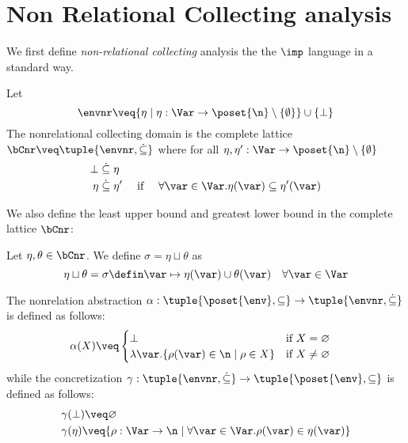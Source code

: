 \section{Non Relational Collecting analysis}
\label{sec:nonrel}

We first define \emph{non-relational collecting} analysis the the
\(\imp\) language in a standard way.

\begin{definition}
  Let
  \begin{equation*}
    \envnr \veq \{\eta \mid \eta: \Var \to \poset{\n}\setminus
    \{\emptyset\}\} \cup \{\bot\}
  \end{equation*}
  The nonrelational collecting domain is the complete lattice
  \(\bCnr \veq \tuple{\envnr,\dot{\subseteq}}\) where for all
  \(\eta,\eta':\Var \to \poset{\n} \setminus \{\emptyset\}\)
  \begin{align*}
    \bot & \mathrel{\dot{\subseteq}} \eta\\
    \eta & \mathrel{\dot{\subseteq}} \eta' & \text{ if }\quad \forall
      \var\in \Var. \eta(\var)\subseteq \eta'(\var)
  \end{align*}
\end{definition}

We also define the least upper bound and greatest lower bound in the
complete lattice \(\bCnr\):

\begin{definition}
  Let \(\eta, \theta \in \bCnr\). We define
  \(\sigma = \eta \sqcup \theta\) as
  \begin{equation*}
    \eta \sqcup \theta = \sigma \defin \var \mapsto \eta(\var) \cup \theta(\var) \quad \forall \var \in \Var
  \end{equation*}
\end{definition}

The nonrelation abstraction \(\alpha: \tuple{\poset{\env},\subseteq}
\to \tuple{\envnr,\dot{\subseteq}}\) is defined as follows:
\begin{align*}
  &\alpha(X) \veq 
  \begin{cases}
    \bot & \text{if }X=\varnothing\\
    \lambda \var. \{\rho(\var) \in \n \mid \rho \in X\} &\text{if }X\neq \varnothing\\
  \end{cases}
\end{align*}
while the concretization \(\gamma: \tuple{\envnr,\dot{\subseteq}} \to
\tuple{\poset{\env},\subseteq}\) is defined as follows:
\begin{align*}
  &\gamma(\bot) \veq \varnothing\\
  &\gamma(\eta) \veq \{\rho : \Var \to \n \mid \forall \var \in \Var. \rho(\var)\in \eta(\var)\}
\end{align*}
